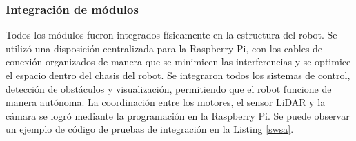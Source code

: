     \subsubsection{Integraci\'on de m\'odulos}
    Todos los m\'odulos fueron integrados f\'isicamente en la estructura del robot. Se utiliz\'o
        una disposici\'on centralizada para la Raspberry Pi, con los cables de conexi\'on
        organizados de manera que se minimicen las interferencias y se optimice el espacio
        dentro del chasis del robot.
    \vskip 0.5cm
    Se integraron todos los sistemas de control, detecci\'on de obst\'aculos y visualizaci\'on,
        permitiendo que el robot funcione de manera aut\'onoma. La coordinaci\'on entre los
        motores, el sensor LiDAR y la c\'amara se logr\'o mediante la programaci\'on en la
        Raspberry Pi. Se puede observar un ejemplo de c\'odigo de pruebas de integraci\'on en la Listing \ref{swsa}.
    \vskip 0.5cm
